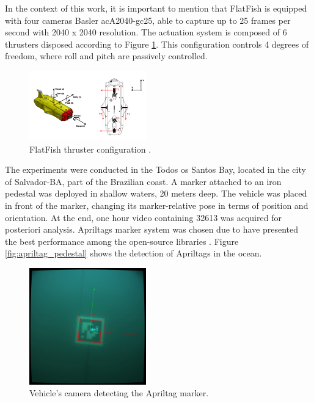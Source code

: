 \documentclass[conference, letterpaper]{IEEEtran}
\begin{document}
In the context of this work, it is important to mention that FlatFish is
equipped with four cameras Basler acA2040-gc25, able to capture up to 25 frames
per second with 2040 x 2040 resolution. The actuation system is composed of 6
thrusters disposed according to Figure \ref{fig:thrusters_configuration}. This
configuration controls 4 degrees of freedom, where roll and pitch are passively
controlled. 

\begin{figure}[!ht]
    \centering
    \includegraphics[width=0.45\textwidth]{./fig/thrust_configuration.png}
    \caption{FlatFish thruster configuration \cite{saback2016}.}
    \label{fig:thrusters_configuration}
\end{figure}

The experiments were conducted in the Todos os Santos Bay, located in the city
of Salvador-BA, part of the Brazilian coast. A marker attached to an iron
pedestal was deployed in shallow waters, 20 meters deep. The vehicle was
placed in front of the marker, changing its marker-relative pose in terms of
position and orientation. At the end, one hour video containing 32613 was
acquired for posteriori analysis. Apriltags marker system was chosen due
to have presented the best performance among the open-source libraries
\cite{diego}.  Figure \ref{fig:apriltag_pedestal} shows the detection of
Apriltags in the ocean.

\begin{figure}[!htpb]
	\centering
	\includegraphics[width=0.45\textwidth]{./fig/april_ocean3.png}
    \caption{Vehicle's camera detecting the Apriltag marker.}
    \label{fig:apriltags_ocean}
\end{figure}
\end{document}
